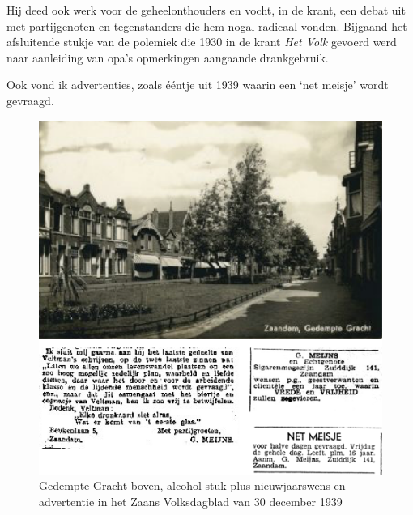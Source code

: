 \documentclass[10pt,twoside, openright]{memoir}
\begin{document}

Hij deed ook werk voor de geheelonthouders en vocht, in de krant, een debat uit met partijgenoten en tegenstanders die hem nogal radicaal vonden. Bijgaand het afsluitende stukje van de polemiek die 1930 in de krant \emph{Het Volk} gevoerd werd naar aanleiding van opa’s opmerkingen aangaande drankgebruik.

Ook vond ik advertenties, zoals ééntje uit 1939 waarin een `net meisje' wordt gevraagd.

\begin{figure}
\includegraphics[width=\textwidth]{img/ch2/collectie}
\caption*{\footnotesize Gedempte Gracht boven, alcohol stuk plus nieuwjaarswens en advertentie in het Zaans Volksdagblad van 30 december 1939}
\end{figure}
\end{document}
